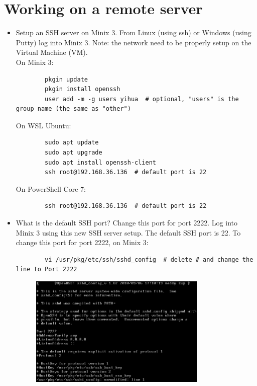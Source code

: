 \documentclass[a4paper]{article}
\begin{document}
\section{Working on a remote server}
\begin{itemize}
    \item Setup an SSH server on Minix 3. From Linux (using ssh) or Windows (using Putty) log into Minix 3. Note: the network need to be properly setup on the Virtual Machine (VM).\\
    On Minix 3:
    \begin{verbatim}
        pkgin update
        pkgin install openssh
        user add -m -g users yihua  # optional, "users" is the group name (the same as "other")
    \end{verbatim}
    On WSL Ubuntu:
    \begin{verbatim}
        sudo apt update
        sudo apt upgrade
        sudo apt install openssh-client
        ssh root@192.168.36.136  # default port is 22
    \end{verbatim}
    On PowerShell Core 7:
    \begin{verbatim}
        ssh root@192.168.36.136  # default port is 22
    \end{verbatim}
    \item What is the default SSH port? Change this port for port 2222. Log into Minix 3 using this new SSH server setup.
    The default SSH port is 22. To change this port for port 2222, on Minix 3:
    \begin{verbatim}
        vi /usr/pkg/etc/ssh/sshd_config  # delete # and change the line to Port 2222
    \end{verbatim}
    \begin{figure}[H]
        \centering
        \includegraphics[width=0.8\textwidth]{1.png}

\end{figure}
\end{itemize}
\end{document}
